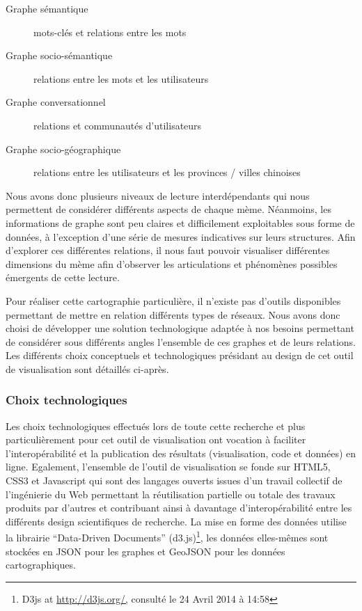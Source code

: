 \begin{description}
    \item[Graphe sémantique] mots-clés et relations entre les mots
    \item[Graphe socio-sémantique] relations entre les mots et les
    utilisateurs
    \item[Graphe conversationnel] relations et communautés
    d{\textquoteright}utilisateurs 
    \item[Graphe socio-géographique] relations entre les utilisateurs et
    les provinces / villes chinoises
\end{description}

Nous avons donc plusieurs niveaux de lecture interdépendants qui nous permettent de considérer différents aspects de chaque mème. Néanmoins, les informations de graphe sont peu claires et difficilement exploitables sous forme de données, à l{\textquoteright}exception d{\textquoteright}une série de mesures indicatives sur leurs structures. Afin d{\textquoteright}explorer ces différentes relations, il nous faut pouvoir visualiser différentes dimensions du mème afin d{\textquoteright}observer les articulations et phénomènes possibles émergents de cette lecture. 

Pour réaliser cette cartographie particulière, il n{\textquoteright}existe pas d{\textquoteright}outils disponibles permettant de mettre en relation différents types de réseaux. Nous avons donc choisi de développer une solution technologique adaptée à nos besoins permettant de considérer sous différents angles l{\textquoteright}ensemble de ces graphes et de leurs relations. Les différents choix conceptuels et technologiques présidant au design de cet outil de visualisation sont détaillés ci-après. 


\subsubsection{Choix technologiques}

Les choix technologiques effectués lors de toute cette recherche et
plus particulièrement pour cet outil de visualisation ont vocation
à faciliter l{\textquoteright}interopérabilité et la publication
des résultats (visualisation, code et données) en ligne. Egalement,
l{\textquoteright}ensemble de l{\textquoteright}outil de visualisation
se fonde sur HTML5, CSS3 et Javascript qui sont des langages ouverts
issues d{\textquoteright}un travail collectif de
l{\textquoteright}ingénierie du Web permettant la réutilisation
partielle ou totale des travaux produits par d{\textquoteright}autres
et contribuant ainsi à davantage
d{\textquoteright}interopérabilité entre les différents design
scientifiques de recherche. La mise en forme des données utilise la
librairie {\textquotedblleft}Data-Driven Documents{\textquotedblright}
(d3.js)\footnote{ D3js at \url{http://d3js.org/,} consulté le 24
Avril 2014 à 14:58}, les données elles-m\^emes sont stockées en
JSON pour les graphes et GeoJSON pour les données cartographiques.

